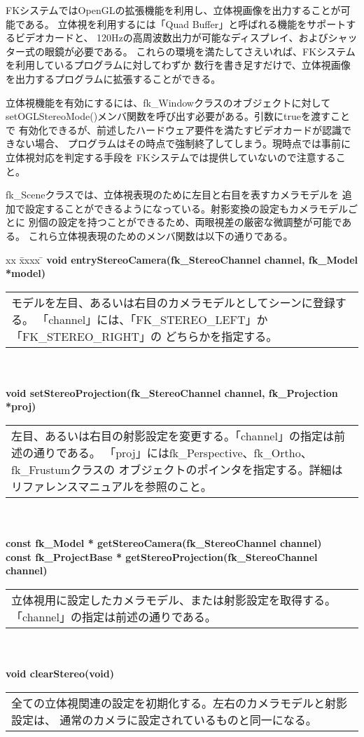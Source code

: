 FKシステムではOpenGLの拡張機能を利用し、立体視画像を出力することが可能である。
立体視を利用するには「Quad Buffer」と呼ばれる機能をサポートするビデオカードと、
120Hzの高周波数出力が可能なディスプレイ、およびシャッター式の眼鏡が必要である。
これらの環境を満たしてさえいれば、FKシステムを利用しているプログラムに対してわずか
数行を書き足すだけで、立体視画像を出力するプログラムに拡張することができる。

立体視機能を有効にするには、fk\_Windowクラスのオブジェクトに対して
setOGLStereoMode()メンバ関数を呼び出す必要がある。引数にtrueを渡すことで
有効化できるが、前述したハードウェア要件を満たすビデオカードが認識できない場合、
プログラムはその時点で強制終了してしまう。現時点では事前に立体視対応を判定する手段を
FKシステムでは提供していないので注意すること。

fk\_Sceneクラスでは、立体視表現のために左目と右目を表すカメラモデルを
追加で設定することができるようになっている。射影変換の設定もカメラモデルごとに
別個の設定を持つことができるため、両眼視差の厳密な微調整が可能である。
これら立体視表現のためのメンバ関数は以下の通りである。
\begin{tabbing}
xx \= xxxx \= \kill
\> \textbf{void entryStereoCamera(fk\_StereoChannel channel, fk\_Model *model)} \\
	\> \> \begin{tabular}{p{15cm}}
		モデルを左目、あるいは右目のカメラモデルとしてシーンに登録する。
		「channel」には、「FK\_STEREO\_LEFT」か「FK\_STEREO\_RIGHT」の
		どちらかを指定する。
	\end{tabular} \\ \\

\> \textbf{void setStereoProjection(fk\_StereoChannel channel, fk\_Projection *proj)} \\
	\> \> \begin{tabular}{p{15cm}}
		左目、あるいは右目の射影設定を変更する。「channel」の指定は前述の通りである。
		「proj」にはfk\_Perspective、fk\_Ortho、fk\_Frustumクラスの
		オブジェクトのポインタを指定する。詳細はリファレンスマニュアルを参照のこと。
	\end{tabular} \\ \\

\> \textbf{const fk\_Model * getStereoCamera(fk\_StereoChannel channel)} \\
\> \textbf{const fk\_ProjectBase * getStereoProjection(fk\_StereoChannel channel)} \\
	\> \> \begin{tabular}{p{15cm}}
		立体視用に設定したカメラモデル、または射影設定を取得する。
		「channel」の指定は前述の通りである。
	\end{tabular} \\ \\

\> \textbf{void clearStereo(void)} \\
	\> \> \begin{tabular}{p{15cm}}
		全ての立体視関連の設定を初期化する。左右のカメラモデルと射影設定は、
		通常のカメラに設定されているものと同一になる。
	\end{tabular}
\end{tabbing}

